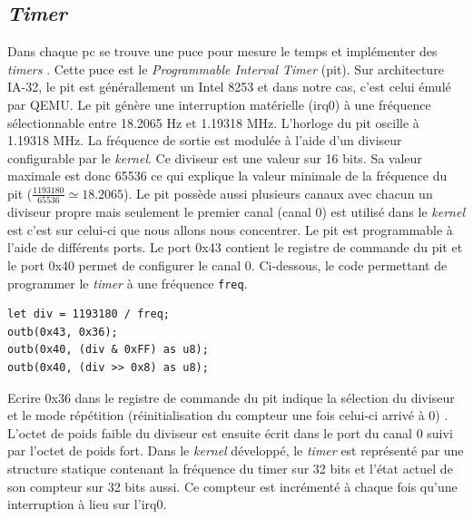 
\subsection{\textit{Timer}}
Dans chaque \acrshort{pc} se trouve une puce pour mesure le temps et implémenter
des \textit{timers} \cite{ref42}. Cette puce est le \textit{Programmable Interval Timer}
(\acrshort{pit}). Sur architecture \acrshort{IA-32}, le \acrshort{pit} est générallement
un Intel 8253 et dans notre cas, c'est celui émulé par QEMU. Le \acrshort{pit}
génère une interruption matérielle (\acrshort{irq}0) à une fréquence sélectionnable
entre 18.2065 Hz et 1.19318 MHz. L'horloge du \acrshort{pit} oscille à 1.19318 MHz.
La fréquence de sortie est modulée à l'aide d'un diviseur configurable par le
\textit{kernel}. Ce diviseur est une valeur sur 16 bits. Sa valeur maximale est
donc 65536 ce qui explique la valeur minimale de la fréquence du \acrshort{pit}
($\frac{1193180}{65536} \simeq 18.2065$). Le \acrshort{pit} possède aussi plusieurs
canaux avec chacun un diviseur propre mais seulement le premier canal (canal 0)
est utilisé dans le \textit{kernel} est c'est sur celui-ci que nous allons nous
concentrer. Le \acrshort{pit} est programmable à l'aide de différents ports.
Le port 0x43 contient le registre de commande du \acrshort{pit} et le port 0x40
permet de configurer le canal 0. Ci-dessous, le code permettant de programmer
le \textit{timer} à une fréquence \texttt{freq}.

\begin{verbatim}
let div = 1193180 / freq;
outb(0x43, 0x36);
outb(0x40, (div & 0xFF) as u8);
outb(0x40, (div >> 0x8) as u8);
\end{verbatim}

Ecrire 0x36 dans le registre de commande du \acrshort{pit} indique la sélection
du diviseur et le mode répétition  (réinitialisation du compteur une fois celui-ci
arrivé à 0) \cite{ref42}. L'octet de poids faible du diviseur est ensuite écrit
dans le port du canal 0 suivi par l'octet de poids fort. Dans le \textit{kernel}
développé, le \textit{timer} est représenté par une structure statique contenant
la fréquence du timer sur 32 bits et l'état actuel de son compteur sur 32 bits aussi.
Ce compteur est incrémenté à chaque fois qu'une interruption à lieu sur l'\acrshort{irq}0.

